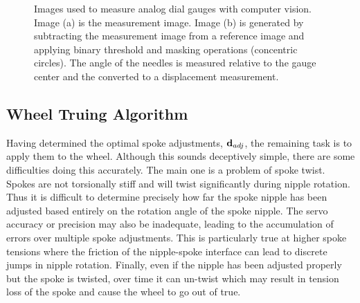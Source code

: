 \documentclass[journal]{IEEEtran}
\begin{document}
\begin{figure}[!t]
    \centering
    \quad
    \caption{Images used to measure analog dial gauges with computer vision. Image (a) is the measurement image.  Image (b) is generated by subtracting the measurement image from a reference image and applying binary threshold and masking operations (concentric circles). The angle of the needles is measured relative to the gauge center and the converted to a displacement measurement.}
    \label{fig:cv_img}
\end{figure}


\subsection{Wheel Truing Algorithm}
Having determined the optimal spoke adjustments, ${\bf d}_{adj}$, the remaining task is to apply them to the wheel. Although this sounds deceptively simple, there are some difficulties doing this accurately.  The main one is a problem of spoke twist. Spokes are not torsionally stiff and will twist significantly during nipple rotation.  Thus it is difficult to determine precisely how far the spoke nipple has been adjusted based entirely on the rotation angle of the spoke nipple. The servo accuracy or precision may also be inadequate, leading to the accumulation of errors over multiple spoke adjustments. This is particularly true at higher spoke tensions where the friction of the nipple-spoke interface can lead to discrete jumps in nipple rotation. Finally, even if the nipple has been adjusted properly but the spoke is twisted, over time it can un-twist which may result in tension loss of the spoke and cause the wheel to go out of true. 
\end{document}

